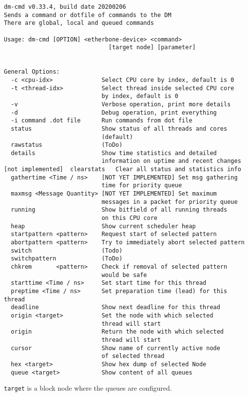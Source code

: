 \begin{lstlisting}[style = helptext]
dm-cmd v0.33.4, build date 20200206
Sends a command or dotfile of commands to the DM
There are global, local and queued commands

Usage: dm-cmd [OPTION] <etherbone-device> <command> 
                              [target node] [parameter] 


General Options:
  -c <cpu-idx>              Select CPU core by index, default is 0
  -t <thread-idx>           Select thread inside selected CPU core
                            by index, default is 0
  -v                        Verbose operation, print more details
  -d                        Debug operation, print everything
  -i command .dot file      Run commands from dot file
  status                    Show status of all threads and cores 
                            (default)
  rawstatus                 (ToDo)
  details                   Show time statistics and detailed 
                            information on uptime and recent changes
[not implemented]  clearstats   Clear all status and statistics info
  gathertime <Time / ns>    [NOT YET IMPLEMENTED] Set msg gathering 
                            time for priority queue
  maxmsg <Message Quantity> [NOT YET IMPLEMENTED] Set maximum 
                            messages in a packet for priority queue
  running                   Show bitfield of all running threads 
                            on this CPU core
  heap                      Show current scheduler heap
  startpattern <pattern>    Request start of selected pattern
  abortpattern <pattern>    Try to immediately abort selected pattern
  switch                    (Todo)
  switchpattern             (ToDo)
  chkrem       <pattern>    Check if removal of selected pattern 
                            would be safe
  starttime <Time / ns>     Set start time for this thread
  preptime <Time / ns>      Set preparation time (lead) for this thread
  deadline                  Show next deadline for this thread
  origin <target>           Set the node with which selected 
                            thread will start
  origin                    Return the node with which selected 
                            thread will start
  cursor                    Show name of currently active node 
                            of selected thread
  hex <target>              Show hex dump of selected Node 
  queue <target>            Show content of all queues
\end{lstlisting}
\texttt{target} is a block node where the queues are configured.
